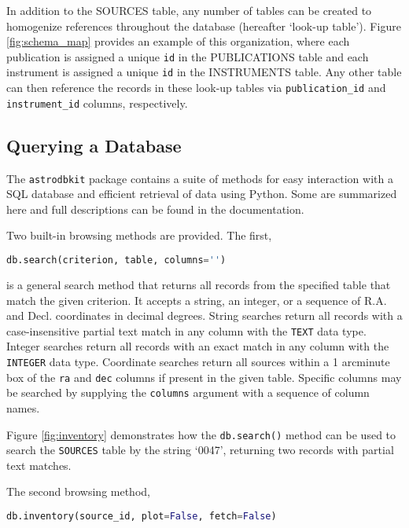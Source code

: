 \documentclass[iop,revtex4,natbib209]{emulateapj}
\begin{document}
In addition to the SOURCES table, any number of tables can be created to homogenize references throughout the database (hereafter `look-up table'). Figure \ref{fig:schema_map} provides an example of this organization, where each publication is assigned a unique \texttt{id} in the PUBLICATIONS table and each instrument is assigned a unique \texttt{id} in the INSTRUMENTS table. Any other table can then reference the records in these look-up tables via \texttt{publication\_id} and \texttt{instrument\_id} columns, respectively.

\subsection{Querying a Database}{\label{sec:query}}
The \texttt{astrodbkit} package contains a suite of methods for easy interaction with a SQL database and efficient retrieval of data using Python. Some are summarized here and full descriptions can be found in the documentation.

Two built-in browsing methods are provided. The first,

\begin{lstlisting}[language=Python]
db.search(criterion, table, columns='')
\end{lstlisting}

is a general search method that returns all records from the specified table that match the given criterion. It accepts a string, an integer, or a sequence of R.A. and Decl. coordinates in decimal degrees. String searches return all records with a case-insensitive partial text match in any column with the \texttt{TEXT} data type. Integer searches return all records with an exact match in any column with the \texttt{INTEGER} data type. Coordinate searches return all sources within a 1 arcminute box of the \texttt{ra} and \texttt{dec} columns if present in the given table. Specific columns may be searched by supplying the \texttt{columns} argument with a sequence of column names.

Figure \ref{fig:inventory} demonstrates how the \texttt{db.search()} method can be used to search the \texttt{SOURCES} table by the string `0047', returning two records with partial text matches.

The second browsing method,

\begin{lstlisting}[language=Python]
db.inventory(source_id, plot=False, fetch=False)
\end{lstlisting}
\end{document}
